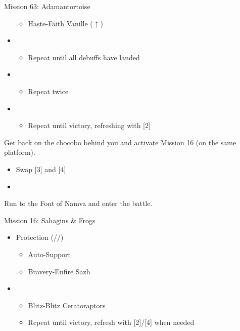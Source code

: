 \begin{battle}{Mission 63: Adamantortoise}
\begin{itemize}
\begin{itemize}
				\item Haste-Faith Vanille ($\uparrow$)
			\end{itemize}
		\item \third
			\begin{itemize}
				\item Repeat until all debuffs have landed
			\end{itemize}
		\item \fifth
			\begin{itemize}
				\item Repeat twice
			\end{itemize}
		\item \first
			\begin{itemize}
				\item Repeat until victory, refreshing with [2]
			\end{itemize}
	\end{itemize}
\end{battle}

Get back on the chocobo behind you and activate Mission 16 (on the same platform).

\begin{menu}
	\begin{itemize}
	\paradigm
		\begin{itemize}
			\item Swap [3] and [4]
			\item {}%
				{\paradigmline{\com}{\com}{\com}}%
				{\paradigmline{\com}{(\sen)}{(\med)}}%
				{\paradigmline{\syn}{\rav}{\sab}}%
				{\paradigmline{\com}{(\sen)}{(\med)}}%
				{\paradigmline[4]{(\syn)}{(\sen)}{(\med)}}%
				{\paradigmline{\rav}{\rav}{\sab}}%
		\end{itemize}
	\end{itemize}
\end{menu}

\renewcommand{\second}{[2] Solidarity (\com/\sen/\med)}
\renewcommand{\third}{[3] Guerilla (\syn/\rav/\sab)}
\renewcommand{\fourth}{[4] Solidarity (\com/\sen/\med)}
\renewcommand{\fifth}{[5] Protection (\syn/\sen/\med)}

Run to the Font of Namva and enter the battle.

\begin{battle}{Mission 16: Sahagins \& Frogs}
	\begin{itemize}
		\item \fifth
			\begin{itemize}
				\item Auto-Support
				\item Bravery-Enfire Sazh
			\end{itemize}
		\item \first
			\begin{itemize}
				\item Blitz-Blitz Ceratoraptors
				\item Repeat until victory, refresh with [2]/[4] when needed
			\end{itemize}
	\end{itemize}
\end{battle}


